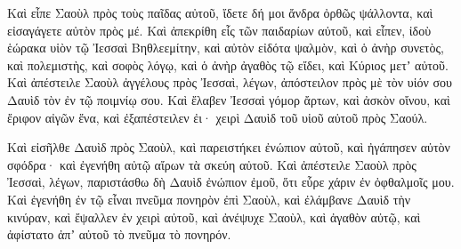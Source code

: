 {Καὶ εἶπε Σαοὺλ πρὸς τοὺς παῖδας αὐτοῦ, ἴδετε δή μοι ἄνδρα ὀρθῶς ψάλλοντα, καὶ εἰσαγάγετε αὐτὸν πρὸς μέ.
Καὶ ἀπεκρίθη εἷς τῶν παιδαρίων αὐτοῦ, καὶ εἶπεν, ἰδοὺ ἑώρακα υἱὸν τῷ Ἰεσσαὶ Βηθλεεμίτην, καὶ αὐτὸν εἰδότα ψαλμὸν, καὶ ὁ ἀνὴρ συνετὸς, καὶ πολεμιστὴς, καὶ σοφὸς λόγῳ, καὶ ὁ ἀνὴρ ἀγαθὸς τῷ εἴδει, καὶ Κύριος μετʼ αὐτοῦ.
Καὶ ἀπέστειλε Σαοὺλ ἀγγέλους πρὸς Ἰεσσαὶ, λέγων, ἀπόστειλον πρὸς μὲ τὸν υἱόν σου Δαυὶδ τὸν ἐν τῷ ποιμνίῳ σου.
Καὶ ἔλαβεν Ἰεσσαὶ γόμορ ἄρτων, καὶ ἀσκὸν οἴνου, καὶ ἔριφον αἰγῶν ἕνα, καὶ ἐξαπέστειλεν ἐι· χειρὶ Δαυὶδ τοῦ υἱοῦ αὐτοῦ πρὸς Σαούλ.
\par }{\PP {}Καὶ εἰσῆλθε Δαυὶδ πρὸς Σαοὺλ, καὶ παρειστήκει ἐνώπιον αὐτοῦ, καὶ ἠγάπησεν αὐτὸν σφόδρα· καὶ ἐγενήθη αὐτῷ αἴρων τὰ σκεύη αὐτοῦ.
Καὶ ἀπέστειλε Σαοὺλ πρὸς Ἰεσσαὶ, λέγων, παριστάσθω δὴ Δαυὶδ ἐνώπιον ἐμοῦ, ὅτι εὗρε χάριν ἐν ὀφθαλμοῖς μου.
Καὶ ἐγενήθη ἐν τῷ εἶναι πνεῦμα πονηρὸν ἐπὶ Σαοὺλ, καὶ ἐλάμβανε Δαυὶδ τὴν κινύραν, καὶ ἔψαλλεν ἐν χειρὶ αὐτοῦ, καὶ ἀνέψυχε Σαοὺλ, καὶ ἀγαθὸν αὐτῷ, καὶ ἀφίστατο ἀπʼ αὐτοῦ τὸ πνεῦμα τὸ πονηρόν.

}
